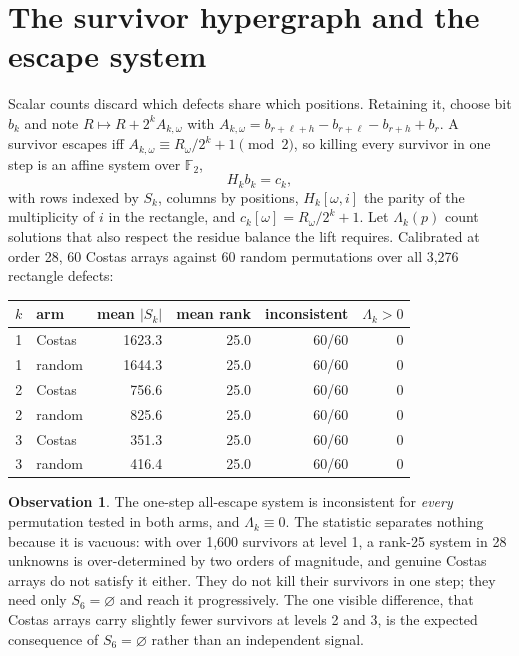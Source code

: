 \documentclass[11pt,a4paper,oneside]{report}
\theoremstyle{definition}
\newtheorem{observation}[theorem]{Observation}
\newcommand{\F}{\mathbb{F}}
\begin{document}
\section{The survivor hypergraph and the escape system}
\label{p7-sec:escape}

Scalar counts discard which defects share which positions. Retaining it, choose
bit $b_k$ and note $R\mapsto R+2^kA_{k,\omega}$ with
$A_{k,\omega}=b_{r+\ell+h}-b_{r+\ell}-b_{r+h}+b_r$. A survivor escapes iff
$A_{k,\omega}\equiv R_\omega/2^k+1 \pmod 2$, so killing every survivor in one
step is an affine system over $\F_2$,
\[
H_k b_k = c_k,
\]
with rows indexed by $S_k$, columns by positions, $H_k[\omega,i]$ the parity of
the multiplicity of $i$ in the rectangle, and $c_k[\omega]=R_\omega/2^k+1$. Let
$\Lambda_k(p)$ count solutions that also respect the residue balance the lift
requires. Calibrated at order 28, 60 Costas arrays against 60 random
permutations over all 3{,}276 rectangle defects:

\begin{center}
\begin{tabular}{@{}rlrrrr@{}}
\toprule
$k$ & arm & mean $|S_k|$ & mean rank & inconsistent & $\Lambda_k>0$ \\
\midrule
1 & Costas & 1623.3 & 25.0 & 60/60 & 0 \\
1 & random & 1644.3 & 25.0 & 60/60 & 0 \\
2 & Costas & 756.6 & 25.0 & 60/60 & 0 \\
2 & random & 825.6 & 25.0 & 60/60 & 0 \\
3 & Costas & 351.3 & 25.0 & 60/60 & 0 \\
3 & random & 416.4 & 25.0 & 60/60 & 0 \\
\bottomrule
\end{tabular}
\end{center}

\begin{observation}
\label{p7-obs:escape}
The one-step all-escape system is inconsistent for \emph{every} permutation
tested in both arms, and $\Lambda_k\equiv0$. The statistic separates nothing
because it is vacuous: with over 1{,}600 survivors at level 1, a rank-25 system
in 28 unknowns is over-determined by two orders of magnitude, and genuine Costas
arrays do not satisfy it either. They do not kill their survivors in one step;
they need only $S_6=\varnothing$ and reach it progressively. The one visible
difference, that Costas arrays carry slightly fewer survivors at levels 2 and 3,
is the expected consequence of $S_6=\varnothing$ rather than an independent
signal.
\end{observation}
\end{document}
